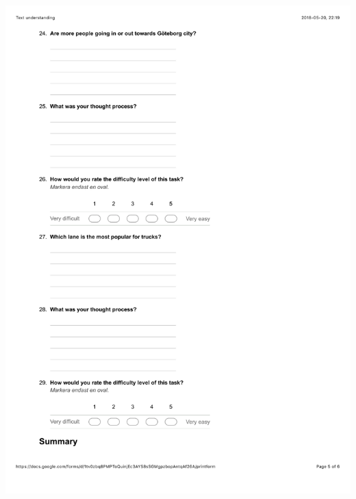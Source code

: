 \documentclass[12pt]{kththesis}
\begin{document}
\begin{appendices}
\includegraphics[width=1\textwidth]{TextUnderstanding5.pdf}
\newpage

\end{appendices}
\end{document}
